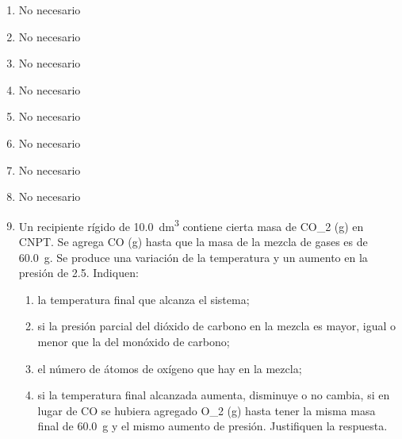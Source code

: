 \documentclass[../Práctica.root.tex]{subfiles}
\begin{document}
\begin{enumerate}
    \item No necesario

    \item No necesario

    \item No necesario

    \item No necesario

    \item No necesario

    \item No necesario

    \item No necesario

    \item No necesario

    \item Un recipiente rígido de \SI{10,0}{\dm\cubed} contiene cierta masa de CO_2 (g) en CNPT. Se agrega CO (g)
          hasta que la masa de la mezcla de gases es de \SI{60,0}{\gram}. Se produce una variación de la
          temperatura y un aumento en la presión de \SI{2,5}{\atm}. Indiquen:
          \begin{enumerate}
              \item la temperatura final que alcanza el sistema;
              \item si la presión parcial del dióxido de carbono en la mezcla es mayor, igual o menor que
                    la del monóxido de carbono;
              \item el número de átomos de oxígeno que hay en la mezcla;
              \item si la temperatura final alcanzada aumenta, disminuye o no cambia, si en lugar de CO
                    se hubiera agregado O_2 (g) hasta tener la misma masa final de \SI{60,0}{\gram} y el mismo
                    aumento de presión. Justifiquen la respuesta.
          \end{enumerate}
\end{enumerate}
\end{document}
